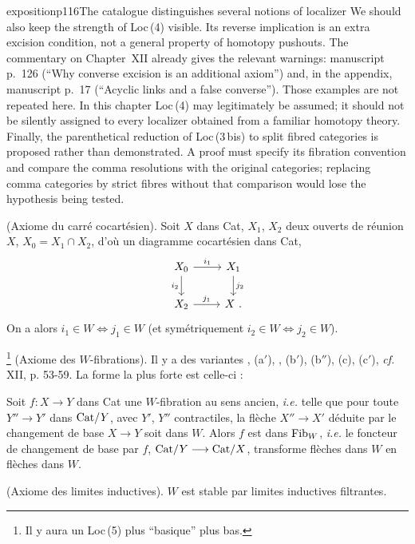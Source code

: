 \begin{dcomment}{exposition}{p116}{The catalogue distinguishes several notions of localizer}
We should also keep the strength of Loc\,(4) visible. Its reverse implication is an extra excision condition, not a general property of homotopy pushouts. The commentary on Chapter~XII already gives the relevant warnings: manuscript p.~126 (``Why converse excision is an additional axiom'') and, in the appendix, manuscript p.~17 (``Acyclic links and a false converse''). Those examples are not repeated here. In this chapter Loc\,(4) may legitimately be assumed; it should not be silently assigned to every localizer obtained from a familiar homotopy theory. Finally, the parenthetical reduction of Loc\,(3\,bis) to split fibred categories is proposed rather than demonstrated. A proof must specify its fibration convention and compare the comma resolutions with the original categories; replacing comma categories by strict fibres without that comparison would lose the hypothesis being tested.
\end{dcomment}


\begin{description}[labelwidth=5.5em,leftmargin=6.5em,style=sameline]
\item[Loc\,(4)] (Axiome du carré cocartésien). Soit $X$ dans Cat, $X_1$, $X_2$ deux ouverts de réunion $X$, $X_0 = X_1\cap X_2$, d'où un diagramme cocartésien dans Cat,
\[
\begin{tikzcd}
X_0 \arrow[r, "i_1"] \arrow[d, "i_2"'] & X_1 \arrow[d, "j_2"] \\
X_2 \arrow[r, "j_1"] & X\ .
\end{tikzcd}
\]
On a alors $i_1\in W \iff j_1\in W$ (et symétriquement $i_2\in W \iff j_2\in W$).

\item[Loc\,(6)]\footnote[44]{Il y aura un Loc\,(5) plus “basique” plus bas.} (Axiome des $W$-fibrations). Il y a des variantes , (a$'$), , (b$'$), (b$''$), (c), (c$'$), \textit{cf.} XII, p. 53-59. La forme la plus forte  est celle-ci :

Soit $f : X\longrightarrow Y$ dans Cat une $W$-fibration au sens ancien, \textit{i.e.} telle que pour toute $Y''\longrightarrow Y'$ dans $\mathrm{Cat}/Y$, avec $Y'$, $Y''$ contractiles, la flèche $X''\longrightarrow X'$ déduite par le changement de base $X\longrightarrow Y$ soit dans $W$. Alors $f$ est dans $\mathrm{Fib}_W$, \textit{i.e.} le foncteur de changement de base par $f$, $\mathrm{Cat}/Y\longrightarrow\mathrm{Cat}/X$, transforme flèches dans $W$ en flèches dans $W$.

\item[Loc\,(7)] (Axiome des limites inductives). $W$ est stable par limites inductives filtrantes.
\end{description}


